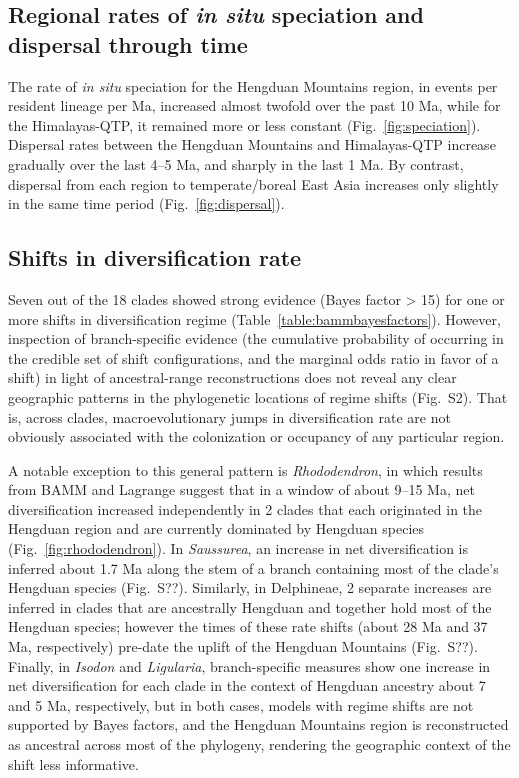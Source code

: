 \subsection*{Regional rates of \textit{in situ} speciation and dispersal through time}

The rate of \textit{in situ} speciation for the Hengduan Mountains region, in events per resident lineage per Ma, increased almost twofold over the past 10 Ma, while for the Himalayas-QTP, it remained more or less constant (Fig.~\ref{fig:speciation}). Dispersal rates between the Hengduan Mountains and Himalayas-QTP increase gradually over the last 4--5 Ma, and sharply in the last 1 Ma. By contrast, dispersal from each region to temperate/boreal East Asia increases only slightly in the same time period (Fig.~\ref{fig:dispersal}).

\subsection*{Shifts in diversification rate}

Seven out of the 18 clades showed strong evidence (Bayes factor > 15) for one or more shifts in diversification regime (Table~\ref{table:bammbayesfactors}). However, inspection of branch-specific evidence (the cumulative probability of occurring in the credible set of shift configurations, and the marginal odds ratio in favor of a shift) in light of ancestral-range reconstructions does not reveal any clear geographic patterns in the phylogenetic locations of regime shifts (Fig.~S2). That is, across clades, macroevolutionary jumps in diversification rate are not obviously associated with the colonization or occupancy of any particular region.

A notable exception to this general pattern is \emph{Rhododendron}, in which results from BAMM and Lagrange suggest that in a window of about 9--15 Ma, net diversification increased independently in 2 clades that each originated in the Hengduan region and are currently dominated by Hengduan species (Fig.~\ref{fig:rhododendron}). In \emph{Saussurea}, an increase in net diversification is inferred about 1.7 Ma along the stem of a branch containing most of the clade's Hengduan species (Fig.~S??). Similarly, in Delphineae, 2 separate increases are inferred in clades that are ancestrally Hengduan and together hold most of the Hengduan species; however the times of these rate shifts (about 28 Ma and 37 Ma, respectively) pre-date the uplift of the Hengduan Mountains (Fig.~S??). Finally, in \emph{Isodon} and \emph{Ligularia}, branch-specific measures show one increase in net diversification for each clade in the context of Hengduan ancestry about 7 and 5 Ma, respectively, but in both cases, models with regime shifts are not supported by Bayes factors, and the Hengduan Mountains region is reconstructed as ancestral across most of the phylogeny, rendering the geographic context of the shift less informative.

